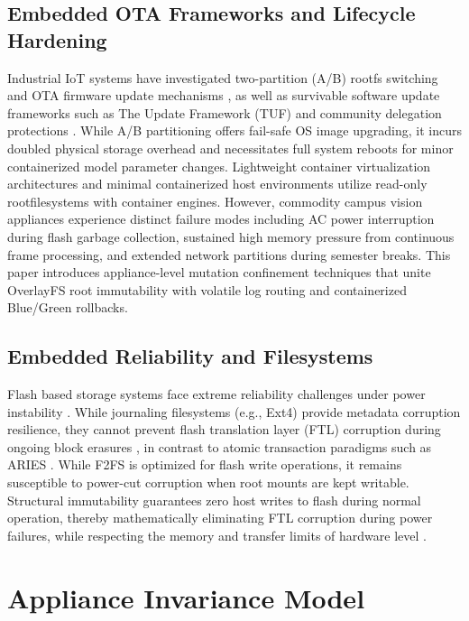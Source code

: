 \documentclass[conference]{IEEEtran}
\begin{document}
\subsection{Embedded OTA Frameworks and Lifecycle Hardening}
Industrial IoT systems have investigated two-partition (A/B) rootfs switching and OTA firmware update mechanisms \cite{b25, b26}, as well as survivable software update frameworks such as The Update Framework (TUF) \cite{b20} and community delegation protections \cite{b18}. While A/B partitioning offers fail-safe OS image upgrading, it incurs doubled physical storage overhead and necessitates full system reboots for minor containerized model parameter changes. Lightweight container virtualization architectures \cite{b27} and minimal containerized host environments \cite{b28} utilize read-only rootfilesystems with container engines. However, commodity campus vision appliances experience distinct failure modes including AC power interruption during flash garbage collection, sustained high memory pressure from continuous frame processing, and extended network partitions during semester breaks. This paper introduces appliance-level mutation confinement techniques that unite OverlayFS root immutability with volatile log routing and containerized Blue/Green rollbacks.

\subsection{Embedded Reliability and Filesystems}
Flash based storage systems face extreme reliability challenges under power instability \cite{b12}. While journaling filesystems (e.g., Ext4) provide metadata corruption resilience, they cannot prevent flash translation layer (FTL) corruption during ongoing block erasures \cite{b14}, in contrast to atomic transaction paradigms such as ARIES \cite{b21}. While F2FS \cite{b13} is optimized for flash write operations, it remains susceptible to power-cut corruption when root mounts are kept writable. Structural immutability guarantees zero host writes to flash during normal operation, thereby mathematically eliminating FTL corruption during power failures, while respecting the memory and transfer limits of hardware level \cite{b24}.

\section{Appliance Invariance Model}
\end{document}

